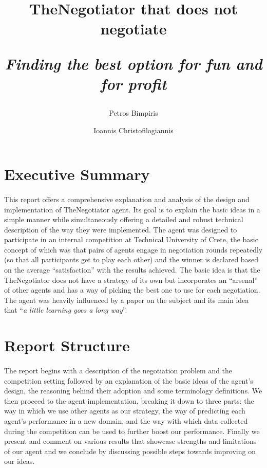 \documentclass[12pt]{article}
\author{%
	Petros Bimpiris
	\and
	Ioannis Christofilogiannis
}
\date{
	\begin{center}
	\hspace{2.5cm}Technical University of Crete
	\newline
	\phantom{--------------}Multiagent Systems (COMP512)		%
	\newline
	February 2024 
	\end{center}
	\vspace{-0.5cm}
}
\title{
	\vspace{-2cm}
	\textbf{TheNegotiator that does not negotiate}
	\vspace{0.05cm}

	{\fontsize{14}{14} \selectfont \emph{Finding the best option for fun and for profit}}
}
\numberwithin{equation}{section}
\newcommand{\quotes}[1]{\textquotedblleft{}#1\textquotedblright}
\begin{document}
 

	\maketitle

	\section*{Executive Summary}	\label{sec:execuctive_summary}		%

		\paragraph*{}
			This report offers a comprehensive explanation and analysis of the design and implementation of TheNegotiator agent. Its goal is to explain the basic ideas in a simple manner while simultaneously offering a detailed and robust technical description of the way they were implemented.
			The agent was designed to participate in an internal competition at Technical University of Crete, the basic concept of which was that pairs of agents engage in negotiation rounds repeatedly (so that all participants get to play each other) and the winner is declared based on the average \quotes{satisfaction} with the results achieved.
			The basic idea is that the TheNegotiator does not have a strategy of its own but incorporates an \quotes{arsenal} of other agents and has a way of picking the best one to use for each negotiation. The agent was heavily influenced by a paper on the subject \cite{meta_agent_paper} and its main idea that \quotes{\emph{a little learning goes a long way}}.


	\section*{Report Structure}	\label{sec:report_structure}		%

		\paragraph*{}
			The report begins with a description of the negotiation problem and the competition setting followed by an explanation of the basic ideas of the agent's design, the reasoning behind their adoption and some terminology definitions.
			We then proceed to the agent implementation, breaking it down to three parts: the way in which we use other agents as our strategy, the way of predicting each agent's performance in a new domain, and the way with which data collected during the competition can be used to further boost our performance. Finally we present and comment on various results that showcase strengths and limitations of our agent and we conclude by discussing possible steps towards improving on our ideas.
			\hfill
\end{document}
